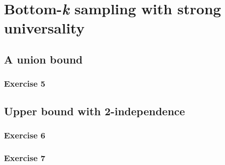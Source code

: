 \section{Bottom-\textit{k} sampling with strong universality}
\subsection{A union bound}
\subsubsection{Exercise 5}
\subsection{Upper bound with 2-independence}
\subsubsection{Exercise 6}
\subsubsection{Exercise 7}

